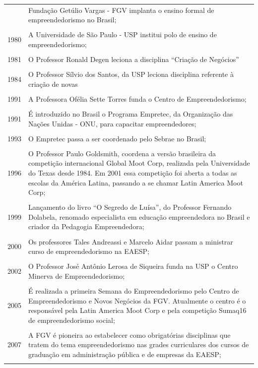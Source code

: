 \begin{center}
\begin{longtable}{p{3.5cm}p{11.0cm}}
\endlastfoot
1980 & Fundação Getúlio Vargas - FGV implanta o ensino formal de empreendedorismo no Brasil;  \\\\\hline
1980 & A Universidade de São Paulo - USP institui polo de ensino de empreendedorismo;  \\\\\hline
1981 & O Professor Ronald Degen leciona a disciplina “Criação de Negócios”  \\\\ \hline
1984 & O Professor Sílvio dos Santos, da USP leciona disciplina referente à criação de novas \\\\ \hline
1991 & A Professora Ofélia Sette Torres funda o Centro de Empreendedorismo;  \\\\\hline
1991 & É introduzido no Brasil o Programa Empretec, da Organização das Nações Unidas - ONU, para
capacitar empreendedores;  \\\\\hline
1993 & O Empretec passa a ser coordenado pelo Sebrae no Brasil;  \\\\ \hline
1996 & O Professor Paulo Goldsmith, coordena a versão brasileira da competição internacional Global Moot Corp, realizada pela Universidade do Texas desde 1984. Em 2001 essa competição foi aberta a todas as escolas da América Latina, passando a se chamar Latin America Moot Corp;\\\\ \hline
1999 & Lançamento do livro “O Segredo de Luísa”, do Professor Fernando Dolabela, renomado
especialista em educação empreendedora no Brasil e criador da Pedagogia Empreendedora;  \\\\ \hline
2000 & Os professores Tales Andreassi e Marcelo Aidar passam a ministrar curso de empreendedorismo
na EAESP;  \\\\ \hline
2002 & O Professor José Antônio Lerosa de Siqueira funda na USP o Centro Minerva de Empreendedorismo;  \\\\\hline 
 2005 & É realizada a primeira Semana do Empreendedorismo pelo Centro de Empreendedorismo e Novos Negócios da FGV. Atualmente o centro é o responsável pela Latin America Moot Corp e pela competição Sumaq16 de empreendedorismo social;  \\\\ \hline 
 2007 & A FGV é pioneira ao estabelecer como obrigatórias disciplinas que tratem do tema empreendedorismo nas grades curriculares dos cursos de graduação em administração pública e de empresas da EAESP; \\\\ \hline
\end{longtable}
\renewcommand\LTcaptype{quadro}
\end{center}


